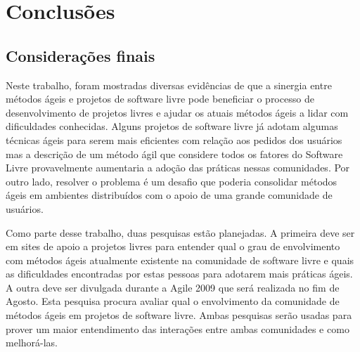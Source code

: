 \chapter{Conclusões}
\label{cap:conclusoes}

\section{Considerações finais}

Neste trabalho, foram mostradas diversas evidências de que a sinergia
entre métodos ágeis e projetos de software livre pode beneficiar o
processo de desenvolvimento de projetos livres e ajudar os atuais
métodos ágeis a lidar com dificuldades conhecidas. Alguns projetos de
software livre já adotam algumas técnicas ágeis para serem mais
eficientes com relação aos pedidos dos usuários mas a descrição de um
método ágil que considere todos os fatores do Software Livre
provavelmente aumentaria a adoção das práticas nessas comunidades. Por
outro lado, resolver o problema é um desafio que poderia consolidar
métodos ágeis em ambientes distribuídos com o apoio de uma grande
comunidade de usuários.

Como parte desse trabalho, duas pesquisas estão planejadas. A primeira
deve ser em sites de apoio a projetos livres para entender qual o grau
de envolvimento com métodos ágeis atualmente existente na comunidade
de software livre e quais as dificuldades encontradas por estas
pessoas para adotarem mais práticas ágeis. A outra deve ser divulgada
durante a Agile 2009 que será realizada no fim de Agosto. Esta
pesquisa procura avaliar qual o envolvimento da comunidade de métodos
ágeis em projetos de software livre. Ambas pesquisas serão usadas para
prover um maior entendimento das interações entre ambas comunidades e
como melhorá-las.


